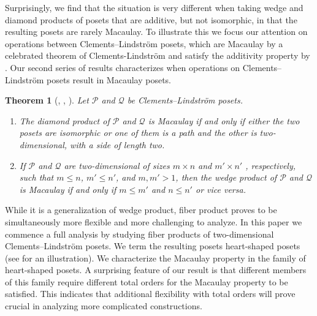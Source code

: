 \documentclass[11pt, reqno]{amsart}
\newcommand{\Q}{{\mathcal Q}}
\renewcommand{\P}{{\mathcal P}}
\theoremstyle{plain} %
\newtheorem{introprop}{Proposition}
\newtheorem{introthm}[introprop]{Theorem}
\theoremstyle{definition}
\theoremstyle{remark}
\numberwithin{equation}{section}  %
\begin{document}

Surprisingly, we find that the situation is very different when taking wedge and diamond products of posets that are additive, but not isomorphic, in that the resulting posets are rarely Macaulay. To illustrate this we focus our attention on operations between Clements--Lindstr\"om posets, which  are Macaulay by a celebrated theorem of Clements-Lindstr\"om \cite{CL} and satisfy the additivity property by \cite{Clements1}. Our second series of results characterizes when operations on Clements--Lindstr\"om posets result in Macaulay posets. 



\begin{introthm}[,  ,   ]\label{introthm B}
Let $\P$ and $\mathcal{Q}$ be Clements--Lindstr\"om posets.
\begin{enumerate}
\item The diamond product of $\P$ and $\Q$ is Macaulay if and only if either the two posets are isomorphic or one of them is a path and the other is two-dimensional, with a side of length two.
\item If $\P$ and $\Q$ are two-dimensional of sizes $m\times n$ and $m'\times n'$ , respectively, such that $m \leq n$, $m' \leq n'$, and $m,m' > 1$, then the wedge product of $\P$ and  $\Q$ is Macaulay if and only if $m \leq m'$ and $n \leq n'$ or vice versa.
\end{enumerate}
\end{introthm}

While it is a generalization of wedge product, fiber product proves to be simultaneously more flexible and more challenging to analyze. In this paper we commence a full analysis by studying fiber products of two-dimensional Clements--Lindstr\"om posets. We term the resulting posets  heart-shaped posets (see  for an illustration). We characterize the Macaulay property in the family of heart-shaped posets. A surprising feature of our result is that different members of this family require different total orders for the Macaulay property to be satisfied. This indicates that additional flexibility with total orders will prove crucial in analyzing more complicated constructions.
\end{document}
